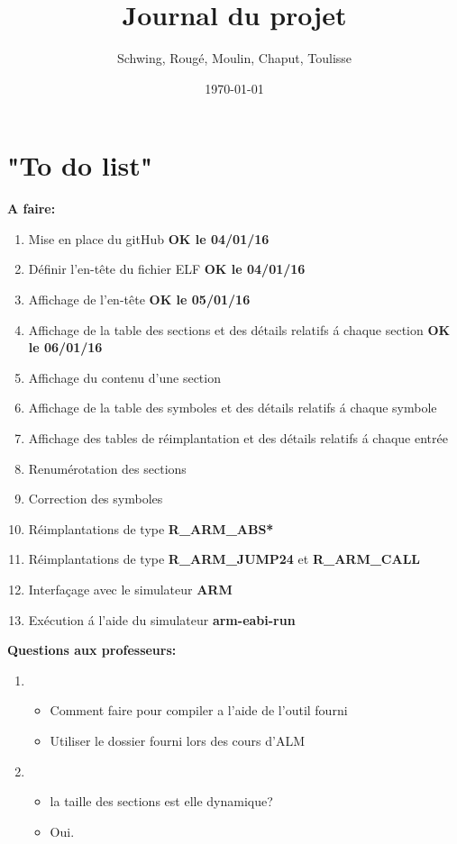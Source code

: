 \documentclass[12pt, a4paper]{article}
\title{Journal du projet}
\author{Schwing, Roug\'e, Moulin, Chaput, Toulisse}
\date{\today}
\begin{document}
\maketitle

\section{"To do list"}
\textbf{A faire:}
\begin{enumerate}
\item Mise en place du gitHub \textbf{OK le 04/01/16} 
\item Définir l'en-t\^ete du fichier ELF \textbf{OK le 04/01/16}
\item Affichage de l'en-t\^ete \textbf{OK le 05/01/16} 
\item Affichage de la table des sections et des détails
	relatifs \'a chaque section \textbf{OK le 06/01/16} 
\item Affichage du contenu d'une section
\item Affichage de la table des symboles et des détails relatifs 
	\'a chaque symbole
\item Affichage des tables de réimplantation et des détails relatifs 
	\'a chaque entrée 
\item Renumérotation des sections
\item Correction des symboles
\item Réimplantations de type \textbf{R\_ARM\_ABS*}
\item Réimplantations de type \textbf{R\_ARM\_JUMP24} et 
	\textbf{R\_ARM\_CALL}
\item Interfaçage avec le simulateur \textbf{ARM}
\item Exécution \'a l'aide du simulateur \textbf{arm-eabi-run}
\end{enumerate}

\textbf{Questions aux professeurs:}
\begin{enumerate}
\item 
	\begin{itemize}
		\item Comment faire pour compiler a l'aide de l'outil fourni
		\item Utiliser le dossier fourni lors des cours d'ALM
	\end{itemize}
\item 
	\begin{itemize}
		\item la taille des sections est elle dynamique?
		\item Oui.
	\end{itemize}
\end{enumerate}
\end{document}
